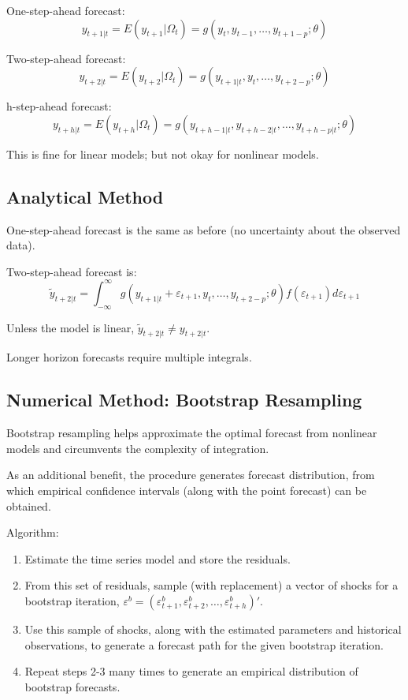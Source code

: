 \documentclass[
  12pt,
  oneside]{book}
\providecommand{\tightlist}{%
  \setlength{\itemsep}{0pt}\setlength{\parskip}{0pt}}
\begin{document}
One-step-ahead forecast: \[y_{t+1|t} = E(y_{t+1}|\Omega_{t}) = g(y_{t},y_{t-1},\ldots,y_{t+1-p};\theta)\]

Two-step-ahead forecast: \[y_{t+2|t} = E(y_{t+2}|\Omega_{t}) = g(y_{t+1|t},y_{t},\ldots,y_{t+2-p};\theta)\]

h-step-ahead forecast: \[y_{t+h|t} = E(y_{t+h}|\Omega_{t}) = g(y_{t+h-1|t},y_{t+h-2|t},\ldots,y_{t+h-p|t};\theta)\]

This is fine for linear models; but not okay for nonlinear models.

\hypertarget{analytical-method}{%
\subsection{Analytical Method}\label{analytical-method}}

One-step-ahead forecast is the same as before (no uncertainty about the observed data).

Two-step-ahead forecast is: \[\tilde{y}_{t+2|t} = \int_{-\infty}^{\infty}g(y_{t+1|t}+\varepsilon_{t+1},y_{t},\ldots,y_{t+2-p};\theta)f(\varepsilon_{t+1})d\varepsilon_{t+1}\]

Unless the model is linear, \(\tilde{y}_{t+2|t} \ne y_{t+2|t}\).

Longer horizon forecasts require multiple integrals.

\hypertarget{numerical-method-bootstrap-resampling}{%
\subsection{Numerical Method: Bootstrap Resampling}\label{numerical-method-bootstrap-resampling}}

Bootstrap resampling helps approximate the optimal forecast from nonlinear models and circumvents the complexity of integration.

As an additional benefit, the procedure generates forecast distribution, from which empirical confidence intervals (along with the point forecast) can be obtained.

Algorithm:

\begin{enumerate}
\def\labelenumi{\arabic{enumi}.}
\tightlist
\item
  Estimate the time series model and store the residuals.
\item
  From this set of residuals, sample (with replacement) a vector of shocks for a bootstrap iteration, \(\varepsilon^b = (\varepsilon_{t+1}^b,\varepsilon_{t+2}^b,\ldots,\varepsilon_{t+h}^b)'\).
\item
  Use this sample of shocks, along with the estimated parameters and historical observations, to generate a forecast path for the given bootstrap iteration.
\item
  Repeat steps 2-3 many times to generate an empirical distribution of bootstrap forecasts.
\end{enumerate}
\end{document}
